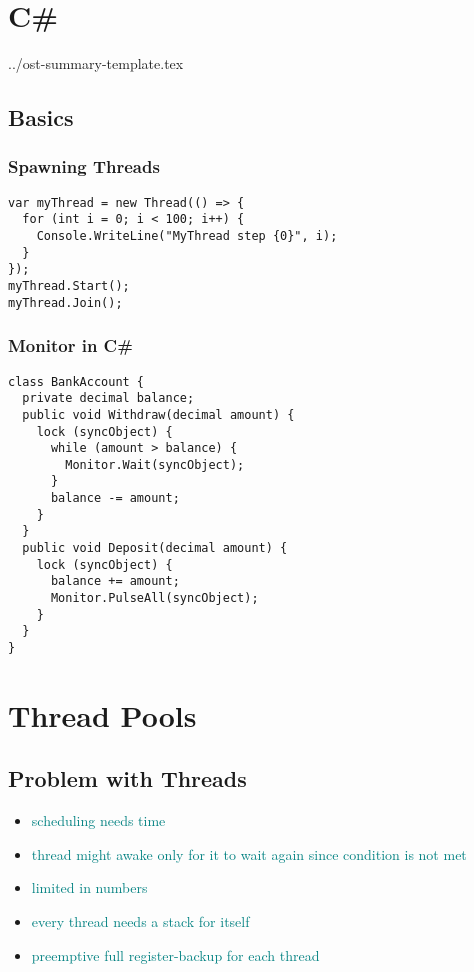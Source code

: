 \documentclass[main.tex,fontsize=8pt,paper=a4,paper=portrait,DIV=calc,]{scrartcl}
\begin{document}
\section{C\#}../ost-summary-template.tex

\subsection{Basics}

\subsubsection{Spawning Threads}
\begin{lstlisting}
var myThread = new Thread(() => {
  for (int i = 0; i < 100; i++) {
    Console.WriteLine("MyThread step {0}", i);
  }
});
myThread.Start();
myThread.Join();
\end{lstlisting}

\subsubsection{Monitor in C\#}
\begin{lstlisting}
class BankAccount {
  private decimal balance;
  public void Withdraw(decimal amount) {
    lock (syncObject) {
      while (amount > balance) {
        Monitor.Wait(syncObject);
      }
      balance -= amount;
    }
  }
  public void Deposit(decimal amount) {
    lock (syncObject) {
      balance += amount;
      Monitor.PulseAll(syncObject);
    }
  }
}
\end{lstlisting}

\section{Thread Pools}

\subsection{Problem with Threads}
\begin{itemize}
\item \textcolor{teal}{scheduling needs time }
\item \textcolor{teal}{thread might awake only for it to wait again since condition is not met}
\item \textcolor{teal}{limited in numbers}
\item \textcolor{teal}{every thread needs a stack for itself}
\item \textcolor{teal}{preemptive full register-backup for each thread}
\end{itemize} 
\end{document}
